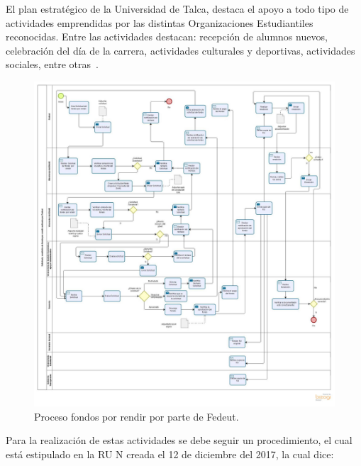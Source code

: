 El plan estratégico de la Universidad de Talca, destaca el apoyo a todo tipo de actividades emprendidas por las distintas Organizaciones Estudiantiles reconocidas. Entre las actividades destacan: recepción de alumnos nuevos, celebración del día de la carrera, actividades culturales y deportivas, actividades sociales, entre otras~\cite{5}.

\begin{figure}[!h]
	\includegraphics[width=\textwidth]{Imagenes/Solicitud_Federacion.jpg}
	\caption{\label{Solicitud_Federacion}Proceso fondos por rendir por parte de Fedeut.}
\end{figure}

Para la realización de estas actividades se debe seguir un procedimiento, el cual está estipulado en la RU N creada el 12 de diciembre del 2017, la cual dice:

